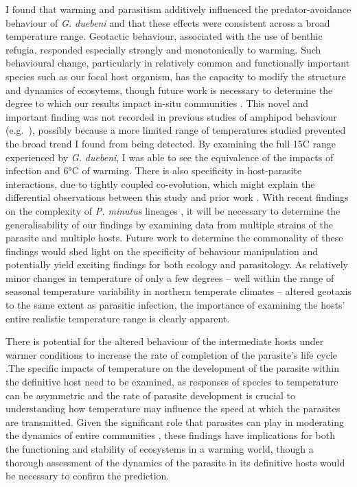I found that warming and parasitism additively influenced the predator-avoidance behaviour of \emph{G. duebeni} and that these effects were consistent across a broad temperature range. Geotactic behaviour, associated with the use of benthic refugia, responded especially strongly and monotonically to warming. Such behavioural change, particularly in relatively common and functionally important species such as our focal host organism, has the capacity to modify the structure and dynamics of ecosytems, though future work is necessary to determine the degree to which our results impact in-situ communities \citep{kefi2015, kefi2016, suraci2016, donohue2017}. This novel and important finding was not recorded in previous studies of amphipod behaviour (e.g.\ \citet{labaude2017}), possibly because a more limited range of temperatures studied prevented the broad trend I found from being detected. By examining the full 15\degree C range experienced by \emph{G. duebeni}, I was able to see the equivalence of the impacts of infection and 6°C of warming. There is also specificity in host-parasite interactions, due to tightly coupled co-evolution, which might explain the differential observations between this study and prior work \citep{omahony2004, westram2011}. With recent findings on the complexity of \emph{P. minutus} lineages \citep{zittel2018}, it will be necessary to determine the generalisability of our findings by examining data from multiple strains of the parasite and multiple hosts. Future work to determine the commonality of these findings would shed light on the specificity of behaviour manipulation and potentially yield exciting findings for both ecology and parasitology. As relatively minor changes in temperature of only a few degrees – well within the range of seasonal temperature variability in northern temperate climates – altered geotaxis to the same extent as parasitic infection, the importance of examining the hosts’ entire realistic temperature range is clearly apparent. 

There is potential for the altered behaviour of the intermediate hosts under warmer conditions to increase the rate of completion of the parasite’s life cycle \citep{tierney1993, strepparava2017}.The specific impacts of temperature on the development of the parasite within the definitive host need to be examined, as responses of species to temperature can be asymmetric \citep{dell2014, goedknegt2015} and the rate of parasite development is crucial to understanding how temperature may influence the speed at which the parasites are transmitted. Given the significant role that parasites can play in moderating the dynamics of entire communities \citep{dunne2013}, these findings have implications for both the functioning and stability of ecosystems in a warming world, though a thorough assessment of the dynamics of the parasite in its definitive hosts would be necessary to confirm the prediction.

